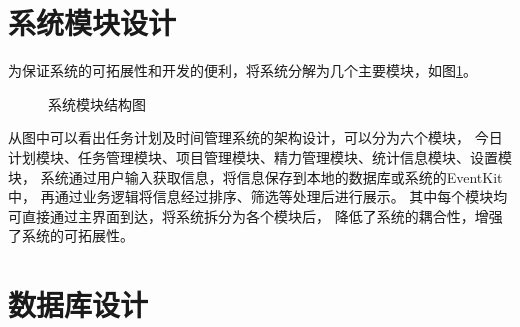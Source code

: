 \section{系统模块设计}
为保证系统的可拓展性和开发的便利，将系统分解为几个主要模块，如图\ref{fig:part}。
\begin{figure}[!htbp]
	\centering
	\caption{系统模块结构图}
    \label{fig:part}
\end{figure}

从图中可以看出任务计划及时间管理系统的架构设计，可以分为六个模块，
今日计划模块、任务管理模块、项目管理模块、精力管理模块、统计信息模块、设置模块，
系统通过用户输入获取信息，将信息保存到本地的数据库或系统的EventKit中，
再通过业务逻辑将信息经过排序、筛选等处理后进行展示。
其中每个模块均可直接通过主界面到达，将系统拆分为各个模块后，
降低了系统的耦合性，增强了系统的可拓展性。

\section{数据库设计}

